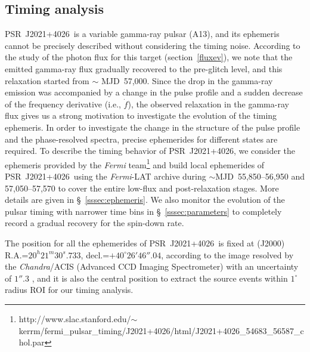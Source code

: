 \documentclass[12pt,preprint]{aastex}
\newcommand{\psr}{PSR~J2021+4026}
\begin{document}
\subsection{Timing analysis}
\label{timing}
\psr\ is a variable gamma-ray pulsar (A13), and its ephemeris cannot be precisely described without considering the timing noise.
According to the study of the photon flux for this target (section~\ref{fluxev}), we note that the emitted gamma-ray flux gradually recovered to the pre-glitch level, and this relaxation started from $\sim$ MJD~57,000.
Since the drop in the gamma-ray emission was accompanied by  a change in the pulse profile and a sudden decrease of the frequency derivative (i.e., $\dot{f}$), the observed relaxation in the gamma-ray flux gives us a strong motivation to investigate the evolution of the timing ephemeris.
In order to investigate the change in the structure of the pulse profile and the phase-resolved spectra, precise ephemerides for different states are required.
To describe the timing behavior of \psr, we consider the ephemeris provided by the \emph{Fermi} team\footnote{http://www.slac.stanford.edu/$\sim$kerrm/fermi\_pulsar\_timing/J2021+4026/html/J2021+4026\_54683\_56587\_chol.par} and build local ephemerides of \psr\ using the \emph{Fermi}-LAT archive during $\sim$MJD~55,850--56,950 and 57,050--57,570 to cover the entire low-flux and post-relaxation stages.
More details are given in \S~\ref{sssec:ephemeris}.
We also monitor the evolution of the pulsar timing with narrower time bins in \S~\ref{sssec:parameters} to completely record a gradual recovery for the spin-down rate.

The position for all the ephemerides of \psr\ is fixed at (J2000) R.A.=$20^h21^m30^s.733$, decl.=$+40^{\circ}26'46''.04$, according to the image resolved by the  \emph{Chandra}/ACIS (Advanced CCD Imaging Spectrometer) with an uncertainty of $1''.3$ \citep{Wei2011}, and it is also the central position to extract the source events within $1^{\circ}$ radius ROI for our timing analysis.
\end{document}
